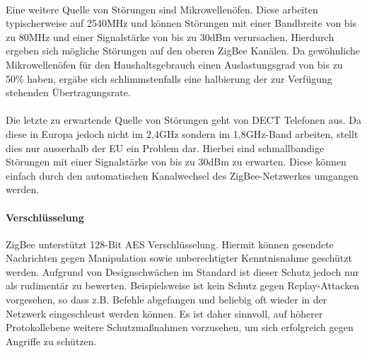                 \\
                Eine weitere Quelle von Störungen sind Mikrowellenöfen. Diese arbeiten typischerweise
                auf 2540MHz und können Störungen mit einer Bandbreite von bis zu 80MHz und einer Signalstärke
                von bis zu 30dBm verursachen. Hierdurch ergeben sich mögliche Störungen auf den
                oberen ZigBee Kanälen. Da gewöhnliche Mikrowellenöfen für den Haushaltsgebrauch einen 
                Auslastungsgrad von bis zu 50\% haben, ergäbe sich schlimmstenfalls eine halbierung der
                zur Verfügung stehenden Übertragungsrate.\\
                \\
                Die letzte zu erwartende Quelle von Störungen geht von DECT Telefonen aus. Da diese in Europa
                jedoch nicht im 2,4GHz sondern im 1,8GHz-Band arbeiten, stellt dies nur ausserhalb der EU ein
                Problem dar. Hierbei sind schmallbandige Störungen mit einer Signalstärke von bis zu 30dBm 
                zu erwarten. Diese können einfach durch den automatischen Kanalwechsel des ZigBee-Netzwerkes
                umgangen werden.\\

            \paragraph{Verschlüsselung}
                ZigBee unterstützt 128-Bit AES Verschlüsselung. Hiermit können gesendete Nachrichten 
                gegen Manipulation sowie unberechtigter Kenntnisnahme geschützt werden. Aufgrund von Designschwächen 
                im Standard ist dieser Schutz jedoch nur als rudimentär zu bewerten. Beispielsweise ist
                kein Schutz gegen Replay-Attacken vorgesehen, so dass z.B. Befehle abgefangen und beliebig oft
                wieder in der Netzwerk eingeschleust werden können. Es ist daher sinnvoll, auf höherer 
                Protokollebene weitere Schutzmaßnahmen vorzusehen, um sich erfolgreich gegen Angriffe zu
                schützen.


